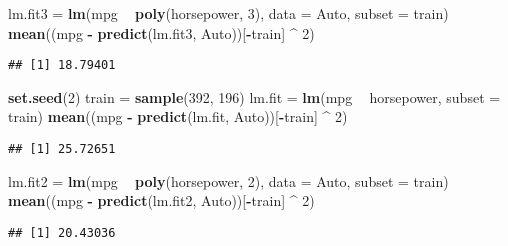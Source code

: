 \documentclass[
]{article}
\newenvironment{Shaded}{\begin{snugshade}}{\end{snugshade}}
\newcommand{\DataTypeTok}[1]{\textcolor[rgb]{0.13,0.29,0.53}{#1}}
\newcommand{\DecValTok}[1]{\textcolor[rgb]{0.00,0.00,0.81}{#1}}
\newcommand{\KeywordTok}[1]{\textcolor[rgb]{0.13,0.29,0.53}{\textbf{#1}}}
\newcommand{\NormalTok}[1]{#1}
\newcommand{\OperatorTok}[1]{\textcolor[rgb]{0.81,0.36,0.00}{\textbf{#1}}}
\newcommand{\StringTok}[1]{\textcolor[rgb]{0.31,0.60,0.02}{#1}}
\begin{document}
\begin{Shaded}
\begin{Highlighting}[]
\NormalTok{lm.fit3 =}\StringTok{ }\KeywordTok{lm}\NormalTok{(mpg }\OperatorTok{~}\StringTok{ }\KeywordTok{poly}\NormalTok{(horsepower, }\DecValTok{3}\NormalTok{), }\DataTypeTok{data =}\NormalTok{ Auto, }\DataTypeTok{subset =}\NormalTok{ train)}
\KeywordTok{mean}\NormalTok{((mpg }\OperatorTok{-}\StringTok{ }\KeywordTok{predict}\NormalTok{(lm.fit3, Auto))[}\OperatorTok{-}\NormalTok{train] }\OperatorTok{^}\StringTok{ }\DecValTok{2}\NormalTok{)}
\end{Highlighting}
\end{Shaded}

\begin{verbatim}
## [1] 18.79401
\end{verbatim}

\begin{Shaded}
\begin{Highlighting}[]
\KeywordTok{set.seed}\NormalTok{(}\DecValTok{2}\NormalTok{)}
\NormalTok{train =}\StringTok{ }\KeywordTok{sample}\NormalTok{(}\DecValTok{392}\NormalTok{, }\DecValTok{196}\NormalTok{)}
\NormalTok{lm.fit =}\StringTok{ }\KeywordTok{lm}\NormalTok{(mpg }\OperatorTok{~}\StringTok{ }\NormalTok{horsepower, }\DataTypeTok{subset =}\NormalTok{ train)}
\KeywordTok{mean}\NormalTok{((mpg }\OperatorTok{-}\StringTok{ }\KeywordTok{predict}\NormalTok{(lm.fit, Auto))[}\OperatorTok{-}\NormalTok{train] }\OperatorTok{^}\StringTok{ }\DecValTok{2}\NormalTok{)}
\end{Highlighting}
\end{Shaded}

\begin{verbatim}
## [1] 25.72651
\end{verbatim}

\begin{Shaded}
\begin{Highlighting}[]
\NormalTok{lm.fit2 =}\StringTok{ }\KeywordTok{lm}\NormalTok{(mpg }\OperatorTok{~}\StringTok{ }\KeywordTok{poly}\NormalTok{(horsepower, }\DecValTok{2}\NormalTok{), }\DataTypeTok{data =}\NormalTok{ Auto, }\DataTypeTok{subset =}\NormalTok{ train)}
\KeywordTok{mean}\NormalTok{((mpg }\OperatorTok{-}\StringTok{ }\KeywordTok{predict}\NormalTok{(lm.fit2, Auto))[}\OperatorTok{-}\NormalTok{train] }\OperatorTok{^}\StringTok{ }\DecValTok{2}\NormalTok{)}
\end{Highlighting}
\end{Shaded}

\begin{verbatim}
## [1] 20.43036
\end{verbatim}
\end{document}
